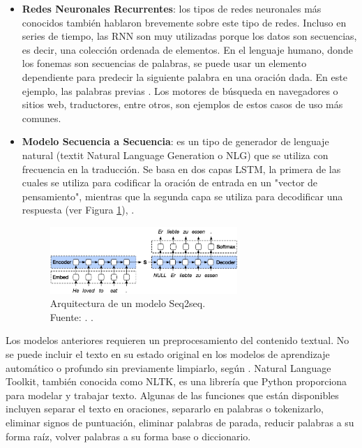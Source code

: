 \begin{itemize}
	\item \textbf{Redes Neuronales Recurrentes}: los tipos de redes neuronales más conocidos también hablaron brevemente sobre este tipo de redes. Incluso en series de tiempo, las RNN son muy utilizadas porque los datos son secuencias, es decir, una colección ordenada de elementos. En el lenguaje humano, donde los fonemas son secuencias de palabras, se puede usar un elemento dependiente para predecir la siguiente palabra en una oración dada. En este ejemplo, las palabras previas \parencite{bk_rao2019nlp_pytorch}. Los motores de búsqueda en navegadores o sitios web, traductores, entre otros, son ejemplos de estos casos de uso más comunes.
	
	\item \textbf{Modelo Secuencia a Secuencia}: es un tipo de generador de lenguaje natural (textit Natural Language Generation o NLG) que se utiliza con frecuencia en la traducción. Se basa en dos capas LSTM, la primera de las cuales se utiliza para codificar la oración de entrada en un "vector de pensamiento", mientras que la segunda capa se utiliza para decodificar una respuesta (ver Figura \ref{2:fig46}), \parencite{bk_deng2018deeplearningnlp}.

	\begin{figure}[!ht]
		\begin{center}
			\includegraphics[width=0.67\textwidth]{2/figures/encoder-decoder.jpg}
			\caption[Arquitectura de un modelo Seq2seq]{Arquitectura de un modelo Seq2seq.\\
			Fuente: \cite{tec_kostadinov2019seq2seq}. .}
			\label{2:fig46}
		\end{center}
	\end{figure}	
\end{itemize}

Los modelos anteriores requieren un preprocesamiento del contenido textual. No se puede incluir el texto en su estado original en los modelos de aprendizaje automático o profundo sin previamente limpiarlo, según \parencite{bk_brownlee2017deeplearning_nlp}. Natural Language Toolkit, también conocida como NLTK, es una librería que Python proporciona para modelar y trabajar texto. Algunas de las funciones que están disponibles incluyen separar el texto en oraciones, separarlo en palabras o tokenizarlo, eliminar signos de puntuación, eliminar palabras de parada, reducir palabras a su forma raíz, volver palabras a su forma base o diccionario.

